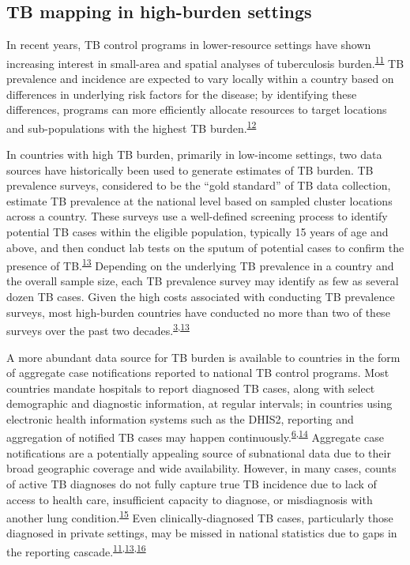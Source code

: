 \documentclass[
]{article}
\begin{document}
\hypertarget{tb-mapping-in-high-burden-settings}{%
\subsection{TB mapping in high-burden settings}\label{tb-mapping-in-high-burden-settings}}

In recent years, TB control programs in lower-resource settings have shown increasing interest in small-area and spatial analyses of tuberculosis burden.\textsuperscript{\protect\hyperlink{ref-Glaziou2018a}{11}} TB prevalence and incidence are expected to vary locally within a country based on differences in underlying risk factors for the disease; by identifying these differences, programs can more efficiently allocate resources to target locations and sub-populations with the highest TB burden.\textsuperscript{\protect\hyperlink{ref-Rood2019}{12}}

In countries with high TB burden, primarily in low-income settings, two data sources have historically been used to generate estimates of TB burden. TB prevalence surveys, considered to be the ``gold standard'' of TB data collection, estimate TB prevalence at the national level based on sampled cluster locations across a country. These surveys use a well-defined screening process to identify potential TB cases within the eligible population, typically 15 years of age and above, and then conduct lab tests on the sputum of potential cases to confirm the presence of TB.\textsuperscript{\protect\hyperlink{ref-Glaziou2008}{13}} Depending on the underlying TB prevalence in a country and the overall sample size, each TB prevalence survey may identify as few as several dozen TB cases. Given the high costs associated with conducting TB prevalence surveys, most high-burden countries have conducted no more than two of these surveys over the past two decades.\textsuperscript{\protect\hyperlink{ref-WorldHealthOrganization2020a}{3},\protect\hyperlink{ref-Glaziou2008}{13}}

A more abundant data source for TB burden is available to countries in the form of aggregate case notifications reported to national TB control programs. Most countries mandate hospitals to report diagnosed TB cases, along with select demographic and diagnostic information, at regular intervals; in countries using electronic health information systems such as the DHIS2, reporting and aggregation of notified TB cases may happen continuously.\textsuperscript{\protect\hyperlink{ref-WorldHealthOrganization2020}{6},\protect\hyperlink{ref-Dehnavieh2019}{14}} Aggregate case notifications are a potentially appealing source of subnational data due to their broad geographic coverage and wide availability. However, in many cases, counts of active TB diagnoses do not fully capture true TB incidence due to lack of access to health care, insufficient capacity to diagnose, or misdiagnosis with another lung condition.\textsuperscript{\protect\hyperlink{ref-Karamagi2018}{15}} Even clinically-diagnosed TB cases, particularly those diagnosed in private settings, may be missed in national statistics due to gaps in the reporting cascade.\textsuperscript{\protect\hyperlink{ref-Glaziou2018a}{11},\protect\hyperlink{ref-Glaziou2008}{13},\protect\hyperlink{ref-Uplekar2016}{16}}
\end{document}
